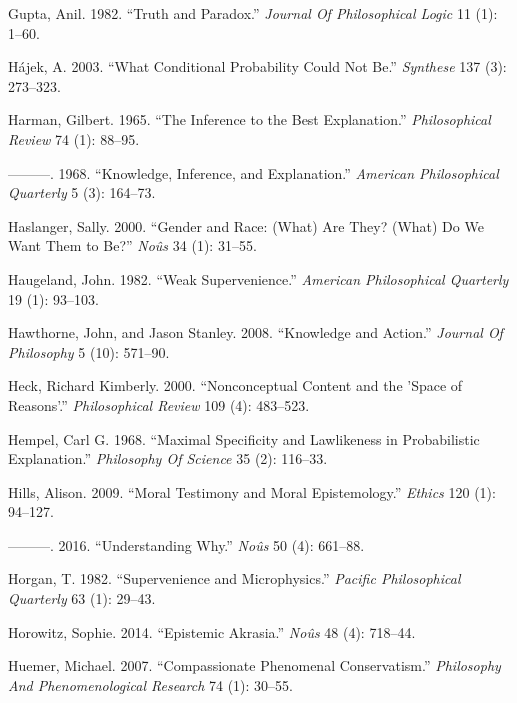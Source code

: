 \documentclass[
  10pt,
  letterpaper,
  DIV=11,
  numbers=noendperiod,
  twoside]{scrartcl}
\newlength{\cslhangindent}
\newenvironment{CSLReferences}[2] %
 {\begin{list}{}{%
  \setlength{\itemindent}{0pt}
  \setlength{\leftmargin}{0pt}
  \setlength{\parsep}{0pt}
  \ifodd #1
   \setlength{\leftmargin}{\cslhangindent}
   \setlength{\itemindent}{-1\cslhangindent}
  \fi
  \setlength{\itemsep}{#2\baselineskip}}}
 {\end{list}}
\begin{document}
\begin{CSLReferences}{1}{0}
Gupta, Anil. 1982. {``Truth and Paradox.''} \emph{Journal Of
Philosophical Logic} 11 (1): 1--60.

Hájek, A. 2003. {``What Conditional Probability Could Not Be.''}
\emph{Synthese} 137 (3): 273--323.

Harman, Gilbert. 1965. {``The Inference to the Best Explanation.''}
\emph{Philosophical Review} 74 (1): 88--95.

---------. 1968. {``Knowledge, Inference, and Explanation.''}
\emph{American Philosophical Quarterly} 5 (3): 164--73.

Haslanger, Sally. 2000. {``Gender and Race: (What) Are They? (What) Do
We Want Them to Be?''} \emph{Noûs} 34 (1): 31--55.

Haugeland, John. 1982. {``Weak Supervenience.''} \emph{American
Philosophical Quarterly} 19 (1): 93--103.

Hawthorne, John, and Jason Stanley. 2008. {``Knowledge and Action.''}
\emph{Journal Of Philosophy} 5 (10): 571--90.

Heck, Richard Kimberly. 2000. {``Nonconceptual Content and the 'Space of
Reasons'.''} \emph{Philosophical Review} 109 (4): 483--523.

Hempel, Carl G. 1968. {``Maximal Specificity and Lawlikeness in
Probabilistic Explanation.''} \emph{Philosophy Of Science} 35 (2):
116--33.

Hills, Alison. 2009. {``Moral Testimony and Moral Epistemology.''}
\emph{Ethics} 120 (1): 94--127.

---------. 2016. {``Understanding Why.''} \emph{Noûs} 50 (4): 661--88.

Horgan, T. 1982. {``Supervenience and Microphysics.''} \emph{Pacific
Philosophical Quarterly} 63 (1): 29--43.

Horowitz, Sophie. 2014. {``Epistemic Akrasia.''} \emph{Noûs} 48 (4):
718--44.

Huemer, Michael. 2007. {``Compassionate Phenomenal Conservatism.''}
\emph{Philosophy And Phenomenological Research} 74 (1): 30--55.


\end{CSLReferences}
\end{document}
